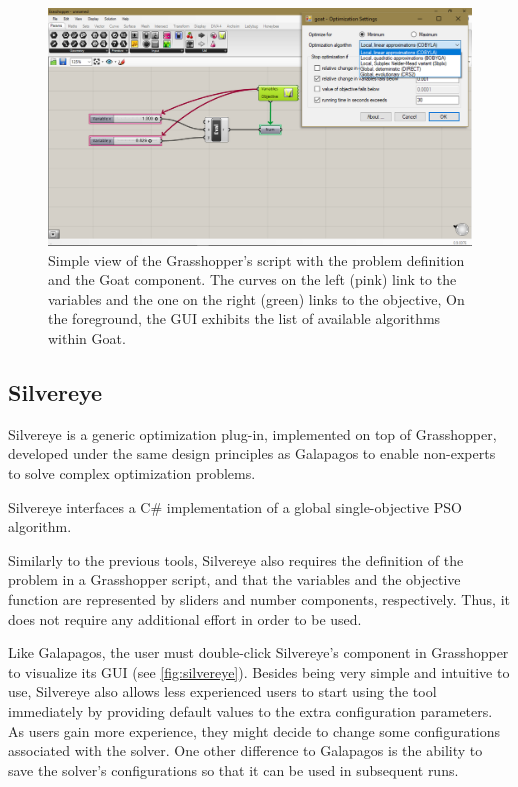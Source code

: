 	\begin{figure}
		\centering
		\includegraphics[width=1\textwidth]{Images/Background/Goat/general-view.png}
		\caption[Goat GUI]{Simple view of the Grasshopper's script with the problem definition and the Goat component. The curves on the left (pink) link to the variables and the one on the right (green) links to the objective, On the foreground, the \ac{GUI} exhibits the list of available algorithms within Goat.}
		\label{fig:goat}
	\end{figure}
	
	
	\subsection{Silvereye}
	Silvereye \cite{Cichocka2017SILVEREYE} is a generic optimization plug-in, implemented on top of Grasshopper, developed under the same design principles as Galapagos to enable non-experts to solve complex optimization problems. 
	
	Silvereye interfaces a C\# implementation of a global single-objective \ac{PSO} algorithm. 
	
	Similarly to the previous tools, Silvereye also requires the definition of the problem in a Grasshopper script, and that the variables and the objective function are represented by sliders and number components, respectively. Thus, it does not require any additional effort in order to be used.
	
	Like Galapagos, the user must double-click Silvereye's component in Grasshopper to visualize its \ac{GUI} (see \cref{fig:silvereye}). Besides being very simple and intuitive to use, Silvereye also allows less experienced users to start using the tool immediately by providing default values to the extra configuration parameters. As users gain more experience, they might decide to change some configurations associated with the solver. One other difference to Galapagos is the ability to save the solver's configurations so that it can be used in subsequent runs.
	
